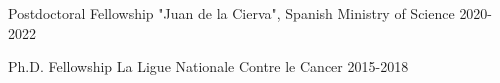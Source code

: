 

\begin{center}  \end{center}


\begin{cvhonors}

     \cvhonor
    {Postdoctoral Fellowship} %
    {"Juan de la Cierva", Spanish Ministry of Science} %
    {2020-2022} %
    {}
    
    \cvhonor
    {Ph.D. Fellowship} %
    {La Ligue Nationale Contre le Cancer} %
    {2015-2018} %
    {}
    
\end{cvhonors}
